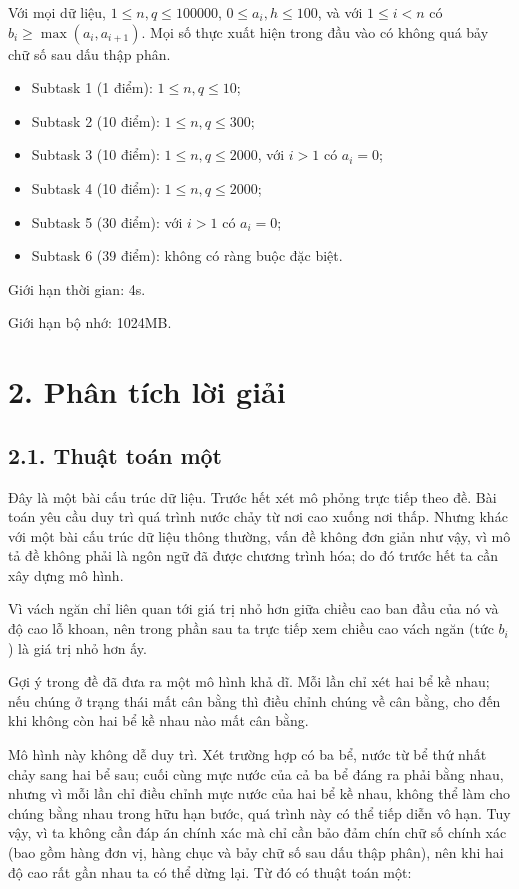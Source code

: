\documentclass[11pt]{article}
\begin{document}
Với mọi dữ liệu, \(1\le n,q\le 100000\), \(0\le a_i,h\le 100\), và với
\(1\le i<n\) có \(b_i\ge \max(a_i,a_{i+1})\). Mọi số thực xuất hiện trong
đầu vào có không quá bảy chữ số sau dấu thập phân.

\begin{itemize}
  \item Subtask 1 (1 điểm): \(1\le n,q\le 10\);
  \item Subtask 2 (10 điểm): \(1\le n,q\le 300\);
  \item Subtask 3 (10 điểm): \(1\le n,q\le 2000\), với \(i>1\) có \(a_i=0\);
  \item Subtask 4 (10 điểm): \(1\le n,q\le 2000\);
  \item Subtask 5 (30 điểm): với \(i>1\) có \(a_i=0\);
  \item Subtask 6 (39 điểm): không có ràng buộc đặc biệt.
\end{itemize}

Giới hạn thời gian: 4s.

Giới hạn bộ nhớ: 1024MB.

\section*{2. Phân tích lời giải}

\subsection*{2.1. Thuật toán một}

Đây là một bài cấu trúc dữ liệu. Trước hết xét mô phỏng trực tiếp theo đề.
Bài toán yêu cầu duy trì quá trình nước chảy từ nơi cao xuống nơi thấp. Nhưng
khác với một bài cấu trúc dữ liệu thông thường, vấn đề không đơn giản như vậy,
vì mô tả đề không phải là ngôn ngữ đã được chương trình hóa; do đó trước hết
ta cần xây dựng mô hình.

Vì vách ngăn chỉ liên quan tới giá trị nhỏ hơn giữa chiều cao ban đầu của nó
và độ cao lỗ khoan, nên trong phần sau ta trực tiếp xem chiều cao vách ngăn
(tức \(b_i\)) là giá trị nhỏ hơn ấy.

Gợi ý trong đề đã đưa ra một mô hình khả dĩ. Mỗi lần chỉ xét hai bể kề nhau;
nếu chúng ở trạng thái mất cân bằng thì điều chỉnh chúng về cân bằng, cho đến
khi không còn hai bể kề nhau nào mất cân bằng.

Mô hình này không dễ duy trì. Xét trường hợp có ba bể, nước từ bể thứ nhất
chảy sang hai bể sau; cuối cùng mực nước của cả ba bể đáng ra phải bằng nhau,
nhưng vì mỗi lần chỉ điều chỉnh mực nước của hai bể kề nhau, không thể làm
cho chúng bằng nhau trong hữu hạn bước, quá trình này có thể tiếp diễn vô
hạn. Tuy vậy, vì ta không cần đáp án chính xác mà chỉ cần bảo đảm chín chữ số
chính xác (bao gồm hàng đơn vị, hàng chục và bảy chữ số sau dấu thập phân),
nên khi hai độ cao rất gần nhau ta có thể dừng lại. Từ đó có thuật toán một:
\end{document}
